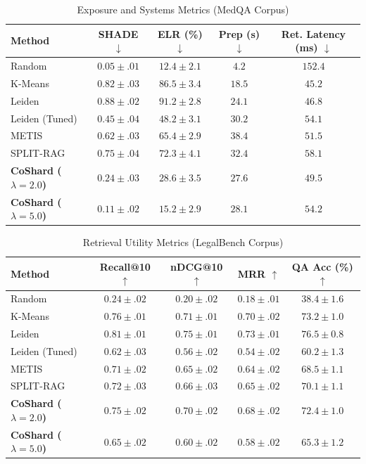 \begin{table}[htbp]
\centering
\caption{Exposure and Systems Metrics (MedQA Corpus)}
\label{tab:ml_metrics_medqa_privacy}
\begin{tabular}{l | c c | c c}
\hline
\textbf{Method} & \textbf{SHADE} $\downarrow$ & \textbf{ELR (\%)} $\downarrow$ & \textbf{Prep (s)} $\downarrow$ & \textbf{Ret. Latency (ms)} $\downarrow$ \\
\hline
Random & $\mathbf{0.05 \pm .01}$ & $\mathbf{12.4 \pm 2.1}$ & $\mathbf{4.2}$ & $152.4$ \\
K-Means & $0.82 \pm .03$ & $86.5 \pm 3.4$ & $18.5$ & $\mathbf{45.2}$ \\
Leiden & $0.88 \pm .02$ & $91.2 \pm 2.8$ & $24.1$ & $46.8$ \\
Leiden (Tuned) & $0.45 \pm .04$ & $48.2 \pm 3.1$ & $30.2$ & $54.1$ \\
METIS & $0.62 \pm .03$ & $65.4 \pm 2.9$ & $38.4$ & $51.5$ \\
SPLIT-RAG & $0.75 \pm .04$ & $72.3 \pm 4.1$ & $32.4$ & $58.1$ \\
\hline
\textbf{CoShard ($\lambda=2.0$)} & $0.24 \pm .03$ & $28.6 \pm 3.5$ & $27.6$ & $49.5$ \\
\textbf{CoShard ($\lambda=5.0$)} & $0.11 \pm .02$ & $15.2 \pm 2.9$ & $28.1$ & $54.2$ \\
\hline
\end{tabular}
\end{table}

\begin{table}[htbp]
\centering
\caption{Retrieval Utility Metrics (LegalBench Corpus)}
\label{tab:ml_metrics_legal_retrieval}
\begin{tabular}{l | c c c c}
\hline
\textbf{Method} & \textbf{Recall@10} $\uparrow$ & \textbf{nDCG@10} $\uparrow$ & \textbf{MRR} $\uparrow$ & \textbf{QA Acc (\%)} $\uparrow$ \\
\hline
Random & $0.24 \pm .02$ & $0.20 \pm .02$ & $0.18 \pm .01$ & $38.4 \pm 1.6$ \\
K-Means & $0.76 \pm .01$ & $0.71 \pm .01$ & $0.70 \pm .02$ & $73.2 \pm 1.0$ \\
Leiden & $\mathbf{0.81 \pm .01}$ & $\mathbf{0.75 \pm .01}$ & $\mathbf{0.73 \pm .01}$ & $\mathbf{76.5 \pm 0.8}$ \\
Leiden (Tuned) & $0.62 \pm .03$ & $0.56 \pm .02$ & $0.54 \pm .02$ & $60.2 \pm 1.3$ \\
METIS & $0.71 \pm .02$ & $0.65 \pm .02$ & $0.64 \pm .02$ & $68.5 \pm 1.1$ \\
SPLIT-RAG & $0.72 \pm .03$ & $0.66 \pm .03$ & $0.65 \pm .02$ & $70.1 \pm 1.1$ \\
\hline
\textbf{CoShard ($\lambda=2.0$)} & $0.75 \pm .02$ & $0.70 \pm .02$ & $0.68 \pm .02$ & $72.4 \pm 1.0$ \\
\textbf{CoShard ($\lambda=5.0$)} & $0.65 \pm .02$ & $0.60 \pm .02$ & $0.58 \pm .02$ & $65.3 \pm 1.2$ \\
\hline
\end{tabular}
\end{table}

